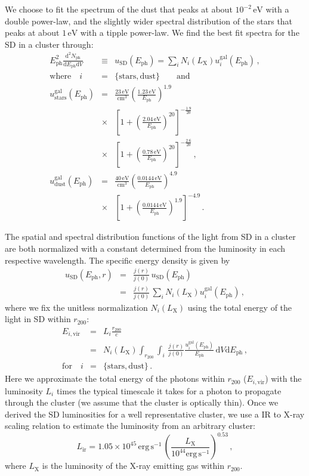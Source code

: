 \documentclass[10pt,aps,pra,reprint,amsmath,amsfonts,amssymb,showpacs]{revtex4-1}
\newcommand{\rmn}{\mathrm}
\newcommand{\ph}{\rmn{ph}}
\newcommand{\eph}{E_\ph}
\newcommand{\vir}{\rmn{vir}}
\newcommand{\gal}{\rmn{gal}}
\newcommand{\sd}{\rmn{SD}}
\newcommand{\stars}{\rmn{stars}}
\newcommand{\dust}{\rmn{dust}}
\newcommand{\lx}{L_\rmn{X}}
\newcommand{\ev}{\rmn{eV}}
\newcommand{\dd}{\rmn{d}}
\newcommand{\rvir}{r_{200}}
\newcommand{\ir}{\rmn{ir}}
\begin{document}
We choose to fit the spectrum of the dust that peaks at about
$10^{-2}\,\ev$ with a double power-law, and the slightly wider
spectral distribution of the stars that peaks at about $1\,\ev$ with a
tipple power-law. We find the best fit spectra for the SD in a
cluster through:
\begin{eqnarray}
  \eph^2\frac{\dd^2 N_\ph}{\dd \eph \dd V}
  &\equiv& u_\sd(\eph) =  \sum_i N_i(\lx) u_i^\gal(\eph)\,,\nonumber \\ 
\rmn{where}\quad i&=&\{\rmn{stars,dust}\} \qquad \rmn{and}\\ 
  u_\stars^\gal(\eph) &=& \frac{23\,\rmn{eV}}{\rmn{cm}^3} 
  \left(\frac{1.23\,\rmn{eV}}{\eph}\right)^{1.9} \nonumber \\
  &\times&\left[1+\left(\frac{2.04\,\rmn{eV}}{\eph}\right)^{20}\right]
  ^{-\frac{1.9}{20}}\nonumber \\
  &\times& \left[1+\left(\frac{0.78\,\rmn{eV}}{\eph}\right)^{20}\right]^{-\frac{2.6}{20}}\,, \\
  u_\dust^\gal(\eph) &=& 
  \frac{40\,\rmn{eV}}{\rmn{cm}^3} 
  \left(\frac{0.0144\,\rmn{eV}}{\eph}\right)^{4.9}\nonumber \\
  &\times& \left[1+\left(\frac{0.0144\,\rmn{eV}}{\eph}\right)^{1.9}\right]^{-4.9}\,.
\end{eqnarray}


The spatial and spectral distribution functions
of the light from SD in a cluster are both normalized with a constant
determined from the luminosity in each respective wavelength. The
specific energy density is given by
\begin{eqnarray} 
u_\sd(\eph, r) &=& \frac{j(r)}{j(0)}\,u_\sd(\eph) \nonumber\\
&=& \frac{j(r)}{j(0)}\,\sum_i N_i(\lx) u_i^\gal(\eph)\,,
\end{eqnarray}
where we fix the unitless normalization $N_i(\lx)$ using the total
energy of the light in SD  within $\rvir$:
\begin{eqnarray} 
  E_{i,\vir} &=& L_i \frac{\rvir}{c} \nonumber \\
  &=&N_i(\lx)\int_{\rvir} \int_i \,\frac{j(r)}{j(0)} 
  \frac{u_i^\gal(\eph)}{\eph}\,\dd V\dd \eph\,,\nonumber \\
 \rmn{for}\quad i&=&\{\rmn{stars,dust}\}\,.
\label{eq:E_SD}
\end{eqnarray}
Here we approximate the total energy of the photons within $\rvir$
($E_{i,\vir}$) with the luminosity $L_i$ \cite{2008A&A...490..547G}
times the typical timescale it takes for a photon to propagate through
the cluster (we assume that the cluster is optically thin). Once we
derived the SD luminosities for a well representative cluster, we use
a IR to X-ray scaling relation to estimate the luminosity from an
arbitrary cluster:
\begin{equation}
L_\ir=1.05\times10^{45}\,\rmn{erg\,s}^{-1}\,
\left(\frac{\lx}{10^{44}\rmn{erg\,s}^{-1}}\right)^{0.53}\,,
\label{eq:SD-X}
\end{equation}
where $\lx$ is the luminosity of the X-ray emitting gas within
$\rvir$.
\end{document}
